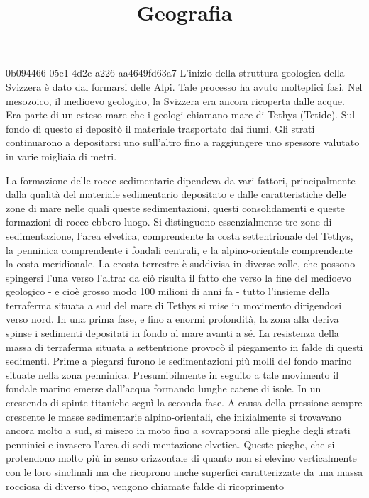 \documentclass[preview]{standalone}
\begin{document}
\title{Geografia}
\genpage

\begin{snippet}{0b094466-05e1-4d2c-a226-aa4649fd63a7}
    L'inizio della struttura geologica della Svizzera è dato dal formarsi delle Alpi. Tale processo
    ha avuto molteplici fasi. Nel mesozoico, il medioevo geologico, la Svizzera era ancora ricoperta
    dalle acque. Era parte di un esteso mare che i geologi chiamano mare di Tethys (Tetide). Sul
    fondo di questo si depositò il materiale trasportato dai fiumi. Gli strati continuarono a
    depositarsi uno sull'altro fino a raggiungere uno spessore valutato in varie migliaia di metri.

    La formazione delle rocce sedimentarie dipendeva da vari fattori, principalmente dalla qualità
    del materiale sedimentario depositato e dalle caratteristiche delle zone di mare nelle quali
    queste sedimentazioni, questi consolidamenti e queste formazioni di rocce ebbero luogo. Si
    distinguono essenzialmente tre zone di sedimentazione, l'area elvetica, comprendente la costa
    settentrionale del Tethys, la penninica comprendente i fondali centrali, e la alpino-orientale
    comprendente la costa meridionale. La crosta terrestre è suddivisa in diverse zolle, che
    possono spingersi l'una verso l'altra: da ciò risulta il fatto che verso la fine del medioevo
    geologico - e cioè grosso modo 100 milioni di anni fa - tutto l'insieme della terraferma situata
    a sud del mare di Tethys si mise in movimento dirigendosi verso nord.
    In una prima fase, e fino a enormi profondità, la zona alla deriva spinse i sedimenti depositati
    in fondo al mare avanti a sé. La resistenza della massa di terraferma situata a settentrione
    provocò il piegamento in falde di questi sedimenti. Prime a piegarsi furono le sedimentazioni
    più molli del fondo marino situate nella zona penninica. Presumibilmente in seguito a tale
    movimento il fondale marino emerse dall'acqua formando lunghe catene di isole. In un
    crescendo di spinte titaniche seguì la seconda fase. A causa della pressione sempre crescente
    le masse sedimentarie alpino-orientali, che inizialmente si trovavano ancora molto a sud, si
    misero in moto fino a sovrapporsi alle pieghe degli strati penninici e invasero l'area di sedi
    mentazione elvetica. Queste pieghe, che si protendono molto più in senso orizzontale di
    quanto non si elevino verticalmente con le loro sinclinali ma che ricoprono anche superfici
    caratterizzate da una massa rocciosa di diverso tipo, vengono chiamate falde di ricoprimento

\end{snippet}
\end{document}
